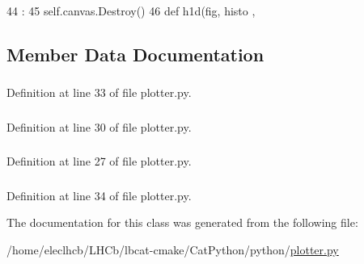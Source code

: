 \begin{DoxyCode}
44                      :
45         self.canvas.Destroy()
46 
def h1d(fig, histo ,
\end{DoxyCode}


\subsection{Member Data Documentation}
\hypertarget{classplotter_1_1plotter_afd401096ff08062bea2ee921a8e58260}{
\subsubsection[{canvas}]{}}
\label{classplotter_1_1plotter_afd401096ff08062bea2ee921a8e58260}


Definition at line 33 of file plotter.py.\hypertarget{classplotter_1_1plotter_add440b02c1e73a0636b4caa318da5b1c}{
\subsubsection[{figid}]{}}
\label{classplotter_1_1plotter_add440b02c1e73a0636b4caa318da5b1c}


Definition at line 30 of file plotter.py.\hypertarget{classplotter_1_1plotter_a3ecf2dd31540fd3973dd783f55fa4d8b}{
\subsubsection[{figure}]{}}
\label{classplotter_1_1plotter_a3ecf2dd31540fd3973dd783f55fa4d8b}


Definition at line 27 of file plotter.py.\hypertarget{classplotter_1_1plotter_a29e30bc0a8a999b5fbd9edd951f7e52d}{
\subsubsection[{toolbar}]{}}
\label{classplotter_1_1plotter_a29e30bc0a8a999b5fbd9edd951f7e52d}


Definition at line 34 of file plotter.py.

The documentation for this class was generated from the following file:\begin{DoxyCompactItemize}
\item 
/home/eleclhcb/LHCb/lbcat-\/cmake/CatPython/python/\hyperlink{plotter_8py}{plotter.py}\end{DoxyCompactItemize}
